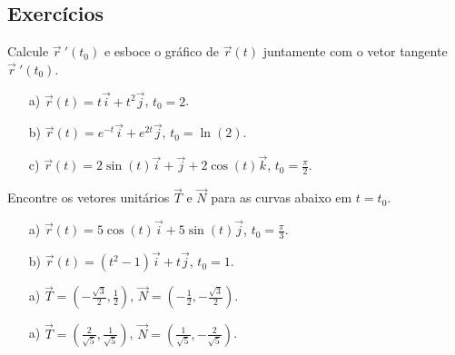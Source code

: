 \subsection*{Exercícios}
\begin{exer}Calcule $\vec{r}\!~'(t_0)$ e esboce o gráfico de $\vec{r}(t)$ juntamente com o vetor tangente $\vec{r}\!~'(t_0)$.
\begin{itemize}
 \item[a)] $\vec{r}(t)=t\vec{i}+t^2\vec{j}$, $t_0=2$.
 \item[b)] $\vec{r}(t)=e^{-t}\vec{i}+e^{2t}\vec{j}$, $t_0=\ln(2)$.
 \item[c)] $\vec{r}(t)=2\sin(t)\vec{i}+\vec{j}+2\cos(t)\vec{k}$, $t_0=\frac{\pi}{2}$.
 \end{itemize}
\end{exer}
\begin{exer}
Encontre os vetores unitários $\vec{T}$ e $\vec{N}$ para as curvas abaixo em $t=t_0$.
\begin{itemize}
 \item[a)] $\vec{r}(t)=5\cos(t)\vec{i}+5\sin(t)\vec{j}$, $t_0=\frac{\pi}{3}$.
 \item[b)] $\vec{r}(t)=(t^2-1)\vec{i}+t\vec{j}$, $t_0=1$.
\end{itemize}
\end{exer}
\begin{resp}
 \begin{itemize}
  \item[a)]$\vec{T}=\left(-\frac{\sqrt{3}}{2},\frac{1}{2}\right)$, $\vec{N}=\left(-\frac{1}{2},-\frac{\sqrt{3}}{2}\right)$.
  \item[a)]$\vec{T}=\left(\frac{2}{\sqrt{5}},\frac{1}{\sqrt{5}}\right)$, $\vec{N}=\left(\frac{1}{\sqrt{5}},-\frac{2}{\sqrt{5}}\right)$.
 \end{itemize}

\end{resp}

